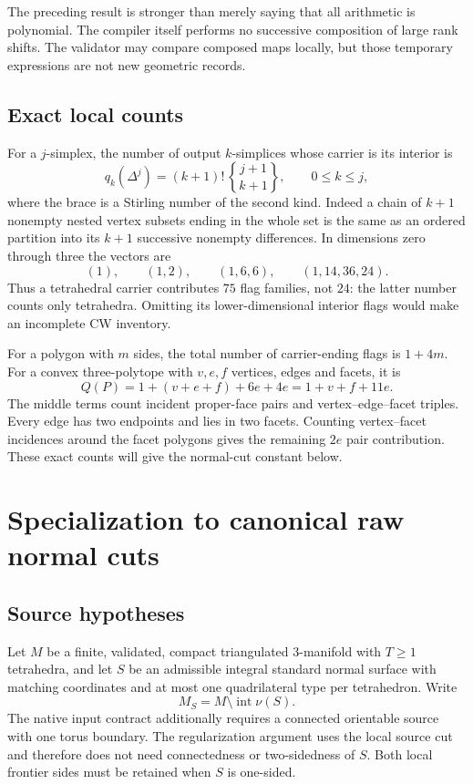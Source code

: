 \documentclass[11pt]{article}
\theoremstyle{definition}\newtheorem{definition}[theorem]{Definition}
\theoremstyle{remark}\newtheorem{remark}[theorem]{Remark}
\begin{document}
The preceding result is stronger than merely saying that all arithmetic is polynomial. The compiler itself performs no successive composition of large rank shifts. The validator may compare composed maps locally, but those temporary expressions are not new geometric records.

\subsection{Exact local counts}
For a \(j\)-simplex, the number of output \(k\)-simplices whose carrier is its interior is
\begin{equation}\label{eq:stirling}
            q_k(\Delta^j)=(k+1)!\,{j+1\brace k+1},\qquad 0\leq k\leq j,
\end{equation}
where the brace is a Stirling number of the second kind. Indeed a chain of \(k+1\) nonempty nested vertex subsets ending in the whole set is the same as an ordered partition into its \(k+1\) successive nonempty differences. In dimensions zero through three the vectors are
\[
 (1),\qquad (1,2),\qquad (1,6,6),\qquad (1,14,36,24).
\]
Thus a tetrahedral carrier contributes \(75\) flag families, not \(24\): the latter number counts only tetrahedra. Omitting its lower-dimensional interior flags would make an incomplete CW inventory.

For a polygon with \(m\) sides, the total number of carrier-ending flags is \(1+4m\). For a convex three-polytope with \(v,e,f\) vertices, edges and facets, it is
\begin{equation}\label{eq:poly-count}
                   Q(P)=1+(v+e+f)+6e+4e=1+v+f+11e.
\end{equation}
The middle terms count incident proper-face pairs and vertex--edge--facet triples. Every edge has two endpoints and lies in two facets. Counting vertex--facet incidences around the facet polygons gives the remaining \(2e\) pair contribution. These exact counts will give the normal-cut constant below.

\section{Specialization to canonical raw normal cuts}
\label{sec:native}

\subsection{Source hypotheses}
Let \(M\) be a finite, validated, compact triangulated 3-manifold with \(T\geq1\) tetrahedra, and let \(S\) be an admissible integral standard normal surface with matching coordinates and at most one quadrilateral type per tetrahedron. Write
\[
                         M_S=M\setminus\operatorname{int}\nu(S).
\]
The native input contract additionally requires a connected orientable source with one torus boundary. The regularization argument uses the local source cut and therefore does not need connectedness or two-sidedness of \(S\). Both local frontier sides must be retained when \(S\) is one-sided.
\end{document}
